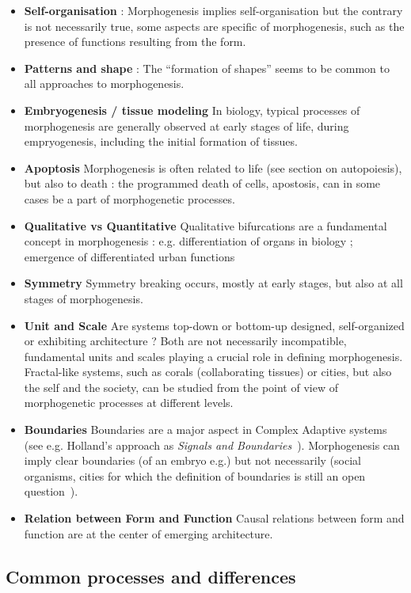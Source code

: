 \documentclass[fleqn,10pt]{wlscirep}
\begin{document}
\begin{itemize}
\item \textbf{Self-organisation} : Morphogenesis implies self-organisation but the contrary is not necessarily true, some aspects are specific of morphogenesis, such as the presence of functions resulting from the form.
\item \textbf{Patterns and shape} : The ``formation of shapes'' seems to be common to all approaches to morphogenesis.
\item \textbf{Embryogenesis / tissue modeling} In biology, typical processes of morphogenesis are generally observed at early stages of life, during empryogenesis, including the initial formation of tissues.
\item \textbf{Apoptosis} Morphogenesis is often related to life (see section on autopoiesis), but also to death : the programmed death of cells, apostosis, can in some cases be a part of morphogenetic processes.
\item \textbf{Qualitative vs Quantitative} Qualitative bifurcations are a fundamental concept in morphogenesis : e.g. differentiation of organs in biology ; emergence of differentiated urban functions
\item \textbf{Symmetry} Symmetry breaking occurs, mostly at early stages, but also at all stages of morphogenesis.
\item \textbf{Unit and Scale} Are systems top-down or bottom-up designed, self-organized or exhibiting architecture ? Both are not necessarily incompatible, fundamental units and scales playing a crucial role in defining morphogenesis. Fractal-like systems, such as corals (collaborating tissues) or cities, but also the self and the society, can be studied from the point of view of morphogenetic processes at different levels.
\item \textbf{Boundaries} Boundaries are a major aspect in Complex Adaptive systems (see e.g. Holland's approach as \emph{Signals and Boundaries}~\cite{holland2012signals}). Morphogenesis can imply clear boundaries (of an embryo e.g.) but not necessarily (social organisms, cities for which the definition of boundaries is still an open question~\cite{2015arXiv150707878C}).
\item \textbf{Relation between Form and Function} Causal relations between form and function are at the center of emerging architecture.
\end{itemize}




\subsection*{Common processes and differences}
\end{document}
